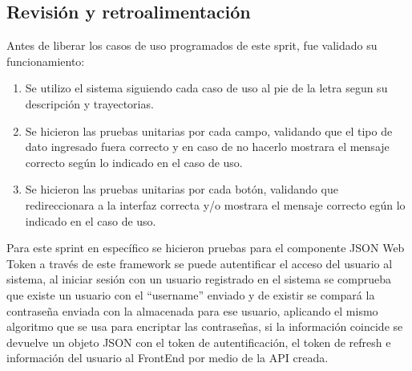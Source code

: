        \subsection{Revisión y retroalimentación}
       Antes de liberar los casos de uso programados de este sprit, fue validado su funcionamiento:
        \begin{enumerate}
            \item Se utilizo el sistema siguiendo cada caso de uso al pie de la letra segun su descripción y trayectorias. 
            \item Se hicieron las pruebas unitarias por cada campo, validando que el tipo de dato ingresado fuera correcto y en caso de no 
            hacerlo mostrara el mensaje correcto según lo indicado en el caso de uso.

            \item Se hicieron las pruebas unitarias por cada botón, validando que redireccionara a la interfaz correcta y/o mostrara el mensaje
            correcto egún lo indicado en el caso de uso.
        \end{enumerate} 
       Para este sprint en específico se hicieron pruebas para el componente JSON Web Token a través de este 
       framework se puede autentificar el acceso del usuario al sistema, al iniciar sesión con un usuario 
       registrado en el sistema se comprueba que existe un usuario con el ``username'' enviado y de existir 
       se compará la contraseña enviada con la almacenada para ese usuario, aplicando el mismo algoritmo que
     se usa para encriptar las contraseñas, si la información coincide se devuelve un objeto JSON con el token de autentificación, el token de refresh e información del usuario al FrontEnd por medio de la API creada.

    


